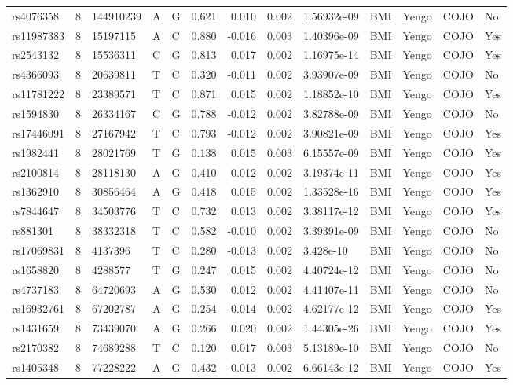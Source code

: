 \documentclass[11pt,twoside]{bristolthesis}
\begin{document}
\begin{longtable}[t]{lrlllrrrlllll}
rs4076358 & 8 & 144910239 & A & G & 0.621 & 0.010 & 0.002 & 1.56932e-09 & BMI & Yengo & COJO & No\\
rs11987383 & 8 & 15197115 & A & C & 0.880 & -0.016 & 0.003 & 1.40396e-09 & BMI & Yengo & COJO & Yes\\
rs2543132 & 8 & 15536311 & C & G & 0.813 & 0.017 & 0.002 & 1.16975e-14 & BMI & Yengo & COJO & Yes\\
\addlinespace
rs4366093 & 8 & 20639811 & T & C & 0.320 & -0.011 & 0.002 & 3.93907e-09 & BMI & Yengo & COJO & No\\
rs11781222 & 8 & 23389571 & T & C & 0.871 & 0.015 & 0.002 & 1.18852e-10 & BMI & Yengo & COJO & Yes\\
rs1594830 & 8 & 26334167 & C & G & 0.788 & -0.012 & 0.002 & 3.82788e-09 & BMI & Yengo & COJO & No\\
rs17446091 & 8 & 27167942 & T & C & 0.793 & -0.012 & 0.002 & 3.90821e-09 & BMI & Yengo & COJO & Yes\\
rs1982441 & 8 & 28021769 & T & G & 0.138 & 0.015 & 0.003 & 6.15557e-09 & BMI & Yengo & COJO & Yes\\
\addlinespace
rs2100814 & 8 & 28118130 & A & G & 0.410 & 0.012 & 0.002 & 3.19374e-11 & BMI & Yengo & COJO & Yes\\
rs1362910 & 8 & 30856464 & A & G & 0.418 & 0.015 & 0.002 & 1.33528e-16 & BMI & Yengo & COJO & Yes\\
rs7844647 & 8 & 34503776 & T & C & 0.732 & 0.013 & 0.002 & 3.38117e-12 & BMI & Yengo & COJO & Yes\\
rs881301 & 8 & 38332318 & T & C & 0.582 & -0.010 & 0.002 & 3.39391e-09 & BMI & Yengo & COJO & No\\
rs17069831 & 8 & 4137396 & T & C & 0.280 & -0.013 & 0.002 & 3.428e-10 & BMI & Yengo & COJO & No\\
\addlinespace
rs1658820 & 8 & 4288577 & T & G & 0.247 & 0.015 & 0.002 & 4.40724e-12 & BMI & Yengo & COJO & No\\
rs4737183 & 8 & 64720693 & A & G & 0.530 & 0.012 & 0.002 & 4.41407e-11 & BMI & Yengo & COJO & No\\
rs16932761 & 8 & 67202787 & A & G & 0.254 & -0.014 & 0.002 & 4.62177e-12 & BMI & Yengo & COJO & Yes\\
rs1431659 & 8 & 73439070 & A & G & 0.266 & 0.020 & 0.002 & 1.44305e-26 & BMI & Yengo & COJO & Yes\\
rs2170382 & 8 & 74689288 & T & C & 0.120 & 0.017 & 0.003 & 5.13189e-10 & BMI & Yengo & COJO & No\\
\addlinespace
rs1405348 & 8 & 77228222 & A & G & 0.432 & -0.013 & 0.002 & 6.66143e-12 & BMI & Yengo & COJO & Yes\\

\end{longtable}
\end{document}
